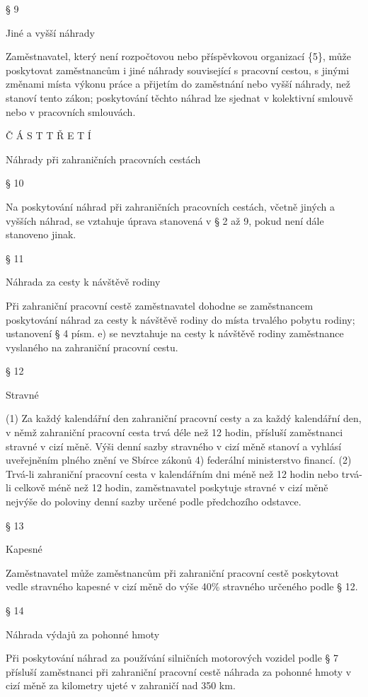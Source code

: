 \documentclass[11pt,a4paper]{article}
\begin{document}
§ 9

Jiné a vyšší náhrady

Zaměstnavatel, který není rozpočtovou nebo příspěvkovou organizací \{5\}, může poskytovat zaměstnancům i jiné náhrady související s pracovní cestou, s jinými změnami místa výkonu práce a přijetím do zaměstnání nebo vyšší náhrady, než stanoví tento zákon; poskytování těchto náhrad lze sjednat v kolektivní smlouvě nebo v pracovních smlouvách.

Č Á S T T Ř E T Í

Náhrady při zahraničních pracovních cestách

§ 10

Na poskytování náhrad při zahraničních pracovních cestách, včetně jiných a vyšších náhrad, se vztahuje úprava stanovená v § 2 až 9, pokud není dále stanoveno jinak.

§ 11

Náhrada za cesty k návštěvě rodiny

Při zahraniční pracovní cestě zaměstnavatel dohodne se zaměstnancem poskytování náhrad za cesty k návštěvě rodiny do místa trvalého pobytu rodiny; ustanovení § 4 písm. e) se nevztahuje na cesty k návštěvě rodiny zaměstnance vyslaného na zahraniční pracovní cestu.

§ 12

Stravné

(1) Za každý kalendářní den zahraniční pracovní cesty a za každý kalendářní den, v němž zahraniční pracovní cesta trvá déle než 12 hodin, přísluší zaměstnanci stravné v cizí měně. Výši denní sazby stravného v cizí měně stanoví a vyhlásí uveřejněním plného znění ve Sbírce zákonů 4) federální ministerstvo financí. (2) Trvá-li zahraniční pracovní cesta v kalendářním dni méně než 12 hodin nebo trvá-li celkově méně než 12 hodin, zaměstnavatel poskytuje stravné v cizí měně nejvýše do poloviny denní sazby určené podle předchozího odstavce.

§ 13

Kapesné

Zaměstnavatel může zaměstnancům při zahraniční pracovní cestě poskytovat vedle stravného kapesné v cizí měně do výše 40\% stravného určeného podle § 12.

§ 14

Náhrada výdajů za pohonné hmoty

Při poskytování náhrad za používání silničních motorových vozidel podle § 7 přísluší zaměstnanci při zahraniční pracovní cestě náhrada za pohonné hmoty v cizí měně za kilometry ujeté v zahraničí nad 350 km.
\end{document}
